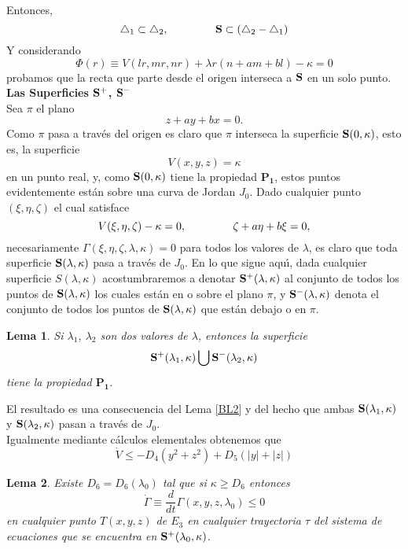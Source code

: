 \documentclass[letter]{article}
\newtheorem{lem}{Lema}
\begin{document}
Entonces,
\begin{equation}\label{Be20}
\triangle_1\subset \triangle_2,\hspace{1.5cm}\mathbf{S}\subset
(\triangle_2-\triangle_1)
\end{equation}
Y considerando
$$\Phi(r)\equiv V(lr,mr,nr)+\lambda r(n+am+bl)-\kappa=0$$
probamos que la recta que parte desde el origen interseca a ${\bf
S}$ en un solo punto.
\\
{\bf\Large{Las Superficies ${\bf S}^{+}$, $ {\bf S}^{-}$}}
\\
Sea $\pi$ el plano
$$z+ay+bx=0.$$
Como $\pi$ pasa a trav{\'e}s del origen es claro que $\pi$ interseca
la superficie ${\bf S}(0,\kappa)$, esto es, la superficie
$$V(x,y,z)=\kappa$$ en un punto real, y, como ${\bf S}(0,\kappa)$ tiene
la propiedad $\mathbf{P_1}$, estos puntos evidentemente est{\'a}n
sobre una curva de Jordan $J_0$. Dado cualquier punto
$(\xi,\eta,\zeta)$ el cual satisface
$$V(\xi,\eta,\zeta)-\kappa=0,\hspace{1.5cm}\zeta+a\eta+b\xi=0,$$
necesariamente $\Gamma(\xi,\eta,\zeta,\lambda,\kappa)=0$ para
todos los valores de $\lambda$, es claro que toda superficie ${\bf
S}(\lambda,\kappa)$ pasa a trav{\'e}s de $J_0$. En lo que sigue aqu{\'\i},
dada cualquier superficie $S(\lambda,\kappa)$ acostumbraremos a
denotar ${\bf S}^+(\lambda,\kappa)$ al conjunto de todos los
puntos de ${\bf S}(\lambda,\kappa)$ los cuales est{\'a}n en o sobre el
plano $\pi$, y ${\bf S}^-(\lambda,\kappa)$ denota el conjunto de
todos los puntos de ${\bf S}(\lambda,\kappa)$ que est{\'a}n debajo o
en $\pi$.
\\
\begin{lem}\label{BL4}Si $\lambda_1$, $\lambda_2$ son dos valores de
$\lambda$, entonces la superficie $${\bf
S}^+(\lambda_1,\kappa)\bigcup {\bf S}^{-}(\lambda_2,\kappa)$$
tiene la propiedad $\mathbf{P_1}$.
\end{lem}
El resultado es una consecuencia del Lema \ref{BL2} y del hecho
que ambas ${\bf S}(\lambda_1,\kappa)$ y ${\bf
S}(\lambda_2,\kappa)$ pasan a trav{\'e}s de
$J_0$.\\
Igualmente mediante c{\'a}lculos elementales obte\-nemos que
\begin{equation}\label{Be26}
\dot{V}\leq -D_4(y^2+z^2)+D_5(|y|+|z|)
\end{equation}
\begin{lem}\label{BL5}Existe $D_6=D_6(\lambda_0)$ tal que si $\kappa\geq
D_6$ entonces
$$\dot{\Gamma}\equiv\displaystyle{\frac{d}{dt}}\Gamma(x,y,z,\lambda_0)\leq0$$
en cualquier punto $T(x,y,z)$ de  $E_3$ en  cualquier trayectoria
$\tau$ del sistema de ecuaciones que se encuentra en ${\bf
S}^+(\lambda_0,\kappa)$.
\end{lem}
\end{document}
